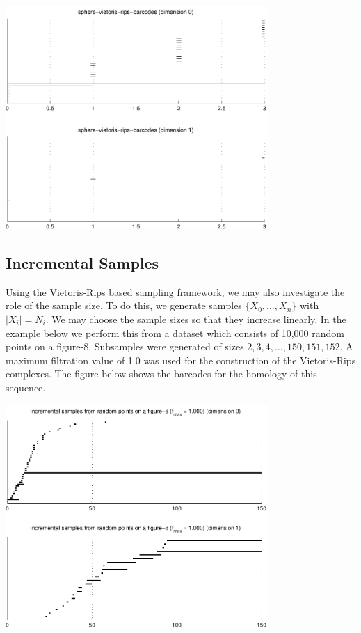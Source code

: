 \documentclass[10pt]{amsart}
\begin{document}
\vspace{0.5cm}
\hspace{3cm}\includegraphics[width=10cm]{sphere-vietoris-rips-barcodes.pdf}
\vspace{0.5cm}

\subsection{Incremental Samples}

Using the Vietoris-Rips based sampling framework, we may also investigate the role of the sample size. To do this, we generate samples $\{X_0, \ldots, X_n\}$ with $|X_i| = N_i$. We may choose the sample sizes so that they increase linearly. In the example below we perform this from a dataset which consists of 10,000 random points on a figure-8. Subsamples were generated of sizes $2, 3, 4, \ldots, 150, 151, 152$. A maximum filtration value of 1.0 was used for the construction of the Vietoris-Rips complexes. The figure below shows the barcodes for the homology of this sequence.

\vspace{0.5cm}
\hspace{3cm}\includegraphics[width=10cm]{incremental-figure-8-barcodes.pdf}
\vspace{0.5cm}
\end{document}
